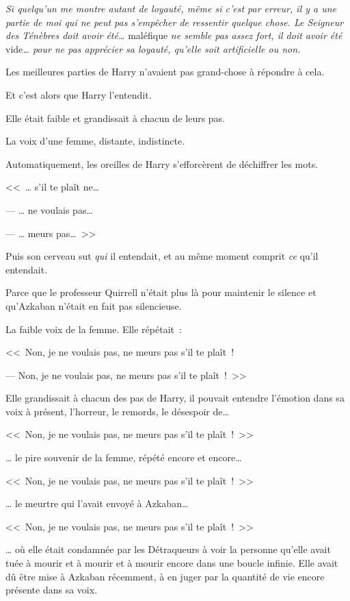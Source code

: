 \emph{Si quelqu'un me montre autant de loyauté, même si c'est par erreur, il y a une partie de moi qui ne peut pas s'empêcher de ressentir quelque chose. Le Seigneur des Ténèbres doit avoir été…} maléfique \emph{ne semble pas assez fort, il doit avoir été} vide\emph{… pour ne pas apprécier sa loyauté, qu'elle soit artificielle ou non.}

Les meilleures parties de Harry n'avaient pas grand-chose à répondre à cela.

Et c'est alors que Harry l'entendit.

Elle était faible et grandissait à chacun de leurs pas.

La voix d'une femme, distante, indistincte.

Automatiquement, les oreilles de Harry s'efforcèrent de déchiffrer les mots.

<<~… s'il te plaît ne…

--- … ne voulais pas…

--- … meurs pas…~>>

Puis son cerveau sut \emph{qui} il entendait, et au même moment comprit \emph{ce} qu'il entendait.

Parce que le professeur Quirrell n'était plus là pour maintenir le silence et qu'Azkaban n'était en fait pas silencieuse.

La faible voix de la femme. Elle répétait~:

<<~Non, je ne voulais pas, ne meurs pas s'il te plaît~!

--- Non, je ne voulais pas, ne meurs pas s'il te plaît~!~>>

Elle grandissait à chacun des pas de Harry, il pouvait entendre l'émotion dans sa voix à présent, l'horreur, le remords, le désespoir de…

<<~Non, je ne voulais pas, ne meurs pas s'il te plaît~!~>>

… le pire souvenir de la femme, répété encore et encore…

<<~Non, je ne voulais pas, ne meurs pas s'il te plaît~!~>>

… le meurtre qui l'avait envoyé à Azkaban…

<<~Non, je ne voulais pas, ne meurs pas s'il te plaît~!~>>

… où elle était condamnée par les Détraqueurs à voir la personne qu'elle avait tuée à mourir et à mourir et à mourir encore dans une boucle infinie. Elle avait dû être mise à Azkaban récemment, à en juger par la quantité de vie encore présente dans sa voix.

